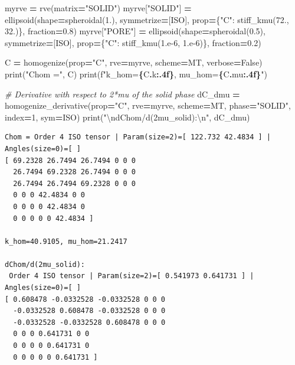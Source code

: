 \documentclass[
  a4paper,
  numbers=noendperiod,
  DIV=12]{scrreprt}
\newenvironment{Shaded}{\begin{snugshade}}{\end{snugshade}}
\newcommand{\BuiltInTok}[1]{#1}
\newcommand{\CharTok}[1]{\textcolor[rgb]{0.31,0.60,0.02}{#1}}
\newcommand{\CommentTok}[1]{\textcolor[rgb]{0.56,0.35,0.01}{\textit{#1}}}
\newcommand{\DecValTok}[1]{\textcolor[rgb]{0.00,0.00,0.81}{#1}}
\newcommand{\FloatTok}[1]{\textcolor[rgb]{0.00,0.00,0.81}{#1}}
\newcommand{\NormalTok}[1]{#1}
\newcommand{\OperatorTok}[1]{\textcolor[rgb]{0.81,0.36,0.00}{\textbf{#1}}}
\newcommand{\SpecialCharTok}[1]{\textcolor[rgb]{0.81,0.36,0.00}{\textbf{#1}}}
\newcommand{\SpecialStringTok}[1]{\textcolor[rgb]{0.31,0.60,0.02}{#1}}
\newcommand{\StringTok}[1]{\textcolor[rgb]{0.31,0.60,0.02}{#1}}
\newcommand{\VariableTok}[1]{\textcolor[rgb]{0.00,0.00,0.00}{#1}}
\begin{document}
\begin{Shaded}
\begin{Highlighting}[]
\NormalTok{myrve }\OperatorTok{=}\NormalTok{ rve(matrix}\OperatorTok{=}\StringTok{"SOLID"}\NormalTok{)}
\NormalTok{myrve[}\StringTok{"SOLID"}\NormalTok{] }\OperatorTok{=}\NormalTok{ ellipsoid(shape}\OperatorTok{=}\NormalTok{spheroidal(}\FloatTok{1.}\NormalTok{), symmetrize}\OperatorTok{=}\NormalTok{[ISO],}
\NormalTok{                           prop}\OperatorTok{=}\NormalTok{\{}\StringTok{"C"}\NormalTok{: stiff\_kmu(}\FloatTok{72.}\NormalTok{, }\FloatTok{32.}\NormalTok{)\}, fraction}\OperatorTok{=}\FloatTok{0.8}\NormalTok{)}
\NormalTok{myrve[}\StringTok{"PORE"}\NormalTok{] }\OperatorTok{=}\NormalTok{ ellipsoid(shape}\OperatorTok{=}\NormalTok{spheroidal(}\FloatTok{0.5}\NormalTok{), symmetrize}\OperatorTok{=}\NormalTok{[ISO],}
\NormalTok{                          prop}\OperatorTok{=}\NormalTok{\{}\StringTok{"C"}\NormalTok{: stiff\_kmu(}\FloatTok{1.e{-}6}\NormalTok{, }\FloatTok{1.e{-}6}\NormalTok{)\}, fraction}\OperatorTok{=}\FloatTok{0.2}\NormalTok{)}

\NormalTok{C }\OperatorTok{=}\NormalTok{ homogenize(prop}\OperatorTok{=}\StringTok{"C"}\NormalTok{, rve}\OperatorTok{=}\NormalTok{myrve, scheme}\OperatorTok{=}\NormalTok{MT, verbose}\OperatorTok{=}\VariableTok{False}\NormalTok{)}
\BuiltInTok{print}\NormalTok{(}\StringTok{"Chom ="}\NormalTok{, C)}
\BuiltInTok{print}\NormalTok{(}\SpecialStringTok{f"k\_hom=}\SpecialCharTok{\{}\NormalTok{C}\SpecialCharTok{.}\NormalTok{k}\SpecialCharTok{:.4f\}}\SpecialStringTok{, mu\_hom=}\SpecialCharTok{\{}\NormalTok{C}\SpecialCharTok{.}\NormalTok{mu}\SpecialCharTok{:.4f\}}\SpecialStringTok{"}\NormalTok{)}

\CommentTok{\# Derivative with respect to 2*mu of the solid phase}
\NormalTok{dC\_dmu }\OperatorTok{=}\NormalTok{ homogenize\_derivative(prop}\OperatorTok{=}\StringTok{"C"}\NormalTok{, rve}\OperatorTok{=}\NormalTok{myrve, scheme}\OperatorTok{=}\NormalTok{MT,}
\NormalTok{                                phase}\OperatorTok{=}\StringTok{"SOLID"}\NormalTok{, index}\OperatorTok{=}\DecValTok{1}\NormalTok{, sym}\OperatorTok{=}\NormalTok{ISO)}
\BuiltInTok{print}\NormalTok{(}\StringTok{"}\CharTok{\textbackslash{}n}\StringTok{dChom/d(2mu\_solid):}\CharTok{\textbackslash{}n}\StringTok{"}\NormalTok{, dC\_dmu)}
\end{Highlighting}
\end{Shaded}

\begin{verbatim}
Chom = Order 4 ISO tensor | Param(size=2)=[ 122.732 42.4834 ] | Angles(size=0)=[ ]
[ 69.2328 26.7494 26.7494 0 0 0 
  26.7494 69.2328 26.7494 0 0 0 
  26.7494 26.7494 69.2328 0 0 0 
  0 0 0 42.4834 0 0 
  0 0 0 0 42.4834 0 
  0 0 0 0 0 42.4834 ]

k_hom=40.9105, mu_hom=21.2417

dChom/d(2mu_solid):
 Order 4 ISO tensor | Param(size=2)=[ 0.541973 0.641731 ] | Angles(size=0)=[ ]
[ 0.608478 -0.0332528 -0.0332528 0 0 0 
  -0.0332528 0.608478 -0.0332528 0 0 0 
  -0.0332528 -0.0332528 0.608478 0 0 0 
  0 0 0 0.641731 0 0 
  0 0 0 0 0.641731 0 
  0 0 0 0 0 0.641731 ]
\end{verbatim}
\end{document}
